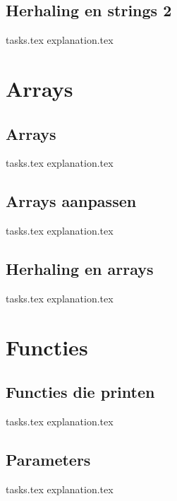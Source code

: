    \section{Herhaling en strings 2}
    {tasks.tex}      \newpage
    {explanation.tex}   \newpage \mbox{} \newpage

    \chapter{Arrays}
    \newpage

    \section{Arrays}
    {tasks.tex}            \newpage
    {explanation.tex}         \newpage

    \section{Arrays aanpassen}
    {tasks.tex}          \newpage
    {explanation.tex}       \newpage

    \section{Herhaling en arrays}
    {tasks.tex}       \newpage
    {explanation.tex}    \newpage

    \chapter{Functies}
    \newpage

    \section{Functies die printen}
    {tasks.tex}        \newpage
    {explanation.tex}     \newpage

    \section{Parameters}
    {tasks.tex}       \newpage
    {explanation.tex}    \newpage

